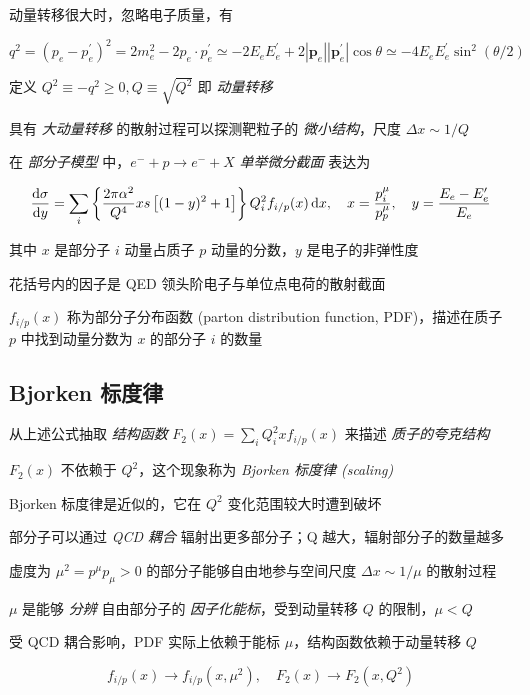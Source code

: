动量转移很大时，忽略电子质量，有

\begin{equation}
    q^2 = (p_e - p_e^\prime)^2 = 2 m_e^2 - 2 p_e \cdot p_e^\prime \simeq -2 E_e E_e^\prime + 2 |\mathbf{p}_e| |\mathbf{p}_e^\prime| \cos\theta \simeq -4 E_e E_e^\prime \sin^2 (\theta/2)
\end{equation}

定义 $Q^2 \equiv -q^2 \ge 0, Q \equiv \sqrt{Q^2}$ 即 \emph{动量转移}

具有 \emph{大动量转移} 的散射过程可以探测靶粒子的 \emph{微小结构}，尺度 $\Delta x \sim 1/Q$

在 \emph{部分子模型} 中，$e^- + p \to e^- + X$ \emph{单举微分截面} 表达为

\begin{equation}
    \frac{\mathop{}\!\mathrm{d}\sigma}{\mathop{}\!\mathrm{d} y} = \sum_i \left\{\frac{2\pi\alpha^2}{Q^4} x s \left[(1-y)^2+1\right]\right\} Q_i^2 f_{i/p}(x) \mathop{}\!\mathrm{d} x, \quad x = \frac{p_i^\mu}{p_p^\mu}, \quad y = \frac{E_e-E_e^\prime}{E_e}
\end{equation}

其中 $x$ 是部分子 $i$ 动量占质子 $p$ 动量的分数，$y$ 是电子的非弹性度

花括号内的因子是 QED 领头阶电子与单位点电荷的散射截面

$f_{i/p}(x)$ 称为部分子分布函数 (parton distribution function, PDF)，描述在质子 $p$ 中找到动量分数为 $x$ 的部分子 $i$ 的数量

\subsection{Bjorken 标度律}

从上述公式抽取 \emph{结构函数} $F_2(x)=\sum_i Q^2_i x f_{i/p}(x)$ 来描述 \emph{质子的夸克结构}

$F_2(x)$ 不依赖于 $Q^2$，这个现象称为 \emph{Bjorken 标度律 (scaling)}

Bjorken 标度律是近似的，它在 $Q^2$ 变化范围较大时遭到破坏

部分子可以通过 \emph{QCD 耦合} 辐射出更多部分子；Q 越大，辐射部分子的数量越多

虚度为 $\mu^2=p^\mu p_\mu > 0$ 的部分子能够自由地参与空间尺度 $\Delta x \sim 1/\mu$ 的散射过程

$\mu$ 是能够 \emph{分辨} 自由部分子的 \emph{因子化能标}，受到动量转移 $Q$ 的限制，$\mu < Q$

受 QCD 耦合影响，PDF 实际上依赖于能标 $\mu$，结构函数依赖于动量转移 $Q$

\begin{equation}
    f_{i/p}(x) \to f_{i/p}(x, \mu^2), \quad F_2(x) \to F_2(x, Q^2)
\end{equation}

